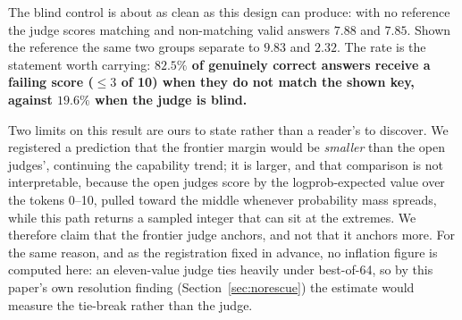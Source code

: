 \documentclass[11pt]{article}
\begin{document}
The blind control is about as clean as this design can produce: with no reference the judge scores matching and non-matching valid answers $7.88$ and $7.85$.
Shown the reference the same two groups separate to $9.83$ and $2.32$.
The rate is the statement worth carrying: \textbf{$82.5\%$ of genuinely correct answers receive a failing score ($\leq 3$ of 10) when they do not match the shown key, against $19.6\%$ when the judge is blind.}

Two limits on this result are ours to state rather than a reader's to discover.
We registered a prediction that the frontier margin would be \emph{smaller} than the open judges', continuing the capability trend; it is larger, and that comparison is not interpretable, because the open judges score by the logprob-expected value over the tokens 0--10, pulled toward the middle whenever probability mass spreads, while this path returns a sampled integer that can sit at the extremes.
We therefore claim that the frontier judge anchors, and not that it anchors more.
For the same reason, and as the registration fixed in advance, no inflation figure is computed here: an eleven-value judge ties heavily under best-of-64, so by this paper's own resolution finding (Section~\ref{sec:norescue}) the estimate would measure the tie-break rather than the judge.
\end{document}
